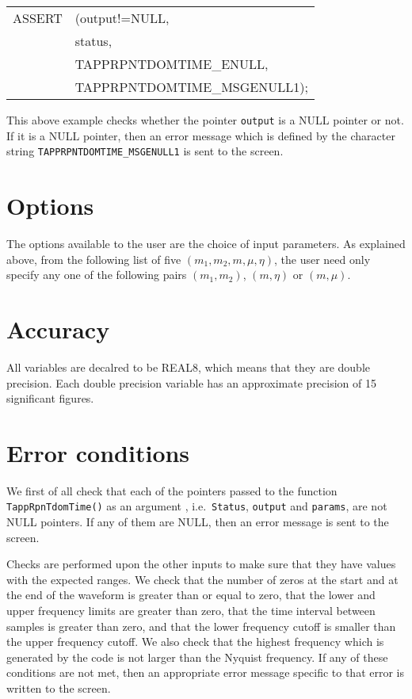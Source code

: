 \documentclass[12pt]{article}
\begin{document}
\vspace{5mm}

\begin{tabular}{ll}
ASSERT & (output!=NULL,  \\
       &  status,    \\
       &  TAPPRPNTDOMTIME\_ENULL, \\
       &  TAPPRPNTDOMTIME\_MSGENULL1);
\end{tabular}

\vspace{5mm}

This above example checks whether the pointer \texttt{output} is a NULL pointer or not. If it is a NULL pointer, then an error message which is defined by the character string \texttt{TAPPRPNTDOMTIME\_MSGENULL1} is sent to the screen.



\section{Options}

The options available to the user are the choice of input parameters. As explained above, from the following list of five $(m_{1},m_{2},m,\mu,\eta)$, the user need only specify any one of the following pairs $(m_{1},m_{2})$, $(m,\eta)$ or $(m,\mu)$.

\section{Accuracy}

All variables are decalred to be REAL8, which means that they are double precision.
Each double precision variable has an approximate precision of 15 significant figures.


\section{Error conditions}

We first of all check that each of the pointers passed to the function \\ \texttt{TappRpnTdomTime()} as an argument , i.e.\ \texttt{Status}, \texttt{output} and \texttt{params}, are not NULL pointers. If any of them are NULL, then an error message is sent to the screen.

Checks are performed upon the other inputs to make sure that they have values with the expected ranges. We check that the number of zeros at the start and at the end of the waveform is greater than or equal to zero, that the lower and upper frequency limits are greater than zero, that the time interval between samples is greater than zero, and that the lower frequency cutoff is smaller than the upper frequency cutoff. 
We also check that the highest frequency which is generated by the code is not larger than the Nyquist frequency. If any of these conditions are not met, then an appropriate error message specific to that error is written to the screen.
\end{document}

